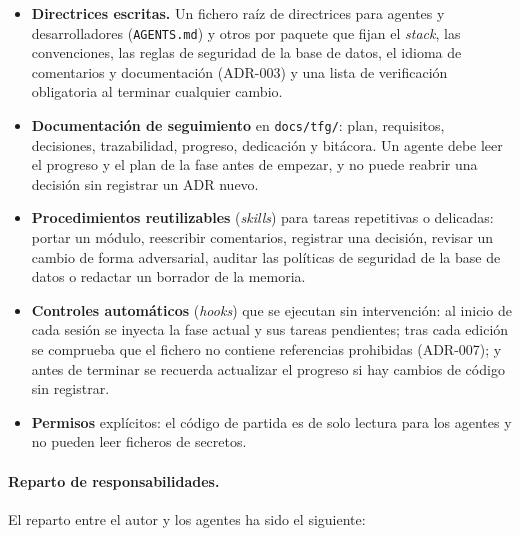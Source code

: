 \begin{itemize}
  \item \textbf{Directrices escritas.} Un fichero raíz de directrices para
        agentes y desarrolladores (\texttt{AGENTS.md}) y otros por paquete que
        fijan el \textit{stack}, las convenciones, las reglas de seguridad de
        la base de datos, el idioma de comentarios y documentación (ADR-003) y
        una lista de verificación obligatoria al terminar cualquier cambio.
  \item \textbf{Documentación de seguimiento} en \texttt{docs/tfg/}: plan,
        requisitos, decisiones, trazabilidad, progreso, dedicación y bitácora.
        Un agente debe leer el progreso y el plan de la fase antes de empezar,
        y no puede reabrir una decisión sin registrar un ADR nuevo.
  \item \textbf{Procedimientos reutilizables} (\textit{skills}) para tareas
        repetitivas o delicadas: portar un módulo, reescribir comentarios,
        registrar una decisión, revisar un cambio de forma adversarial, auditar
        las políticas de seguridad de la base de datos o redactar un borrador
        de la memoria.
  \item \textbf{Controles automáticos} (\textit{hooks}) que se ejecutan sin
        intervención: al inicio de cada sesión se inyecta la fase actual y sus
        tareas pendientes; tras cada edición se comprueba que el fichero no
        contiene referencias prohibidas (ADR-007); y antes de terminar se
        recuerda actualizar el progreso si hay cambios de código sin
        registrar.
  \item \textbf{Permisos} explícitos: el código de partida es de solo lectura
        para los agentes y no pueden leer ficheros de secretos.
\end{itemize}

\paragraph{Reparto de responsabilidades.}
El reparto entre el autor y los agentes ha sido el siguiente:

